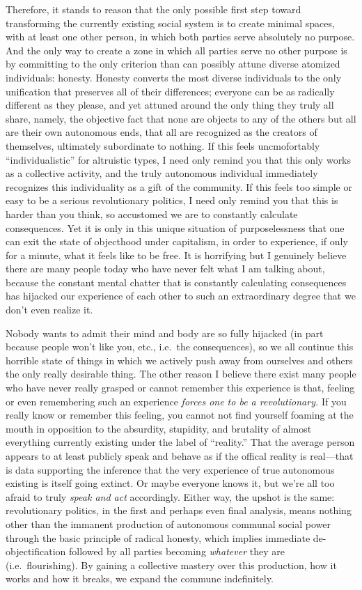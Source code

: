 \documentclass[a4paper,12pt,margin=.5in]{article}
\begin{document}
Therefore, it stands to reason that the only possible first step toward
transforming the currently existing social system is to create minimal
spaces, with at least one other person, in which both parties serve
absolutely no purpose. And the only way to create a zone in which all
parties serve no other purpose is by committing to the only criterion
than can possibly attune diverse atomized individuals: honesty. Honesty
converts the most diverse individuals to the only unification that
preserves all of their differences; everyone can be as radically
different as they please, and yet attuned around the only thing they
truly all share, namely, the objective fact that none are objects to any
of the others but all are their own autonomous ends, that all are
recognized as the creators of themselves, ultimately subordinate to
nothing. If this feels uncmofortably ``individualistic'' for altruistic
types, I need only remind you that this only works as a collective
activity, and the truly autonomous individual immediately recognizes
this individuality as a gift of the community. If this feels too simple
or easy to be a serious revolutionary politics, I need only remind you
that this is harder than you think, so accustomed we are to constantly
calculate consequences. Yet it is only in this unique situation of
purposelessness that one can exit the state of objecthood under
capitalism, in order to experience, if only for a minute, what it feels
like to be free. It is horrifying but I genuinely believe there are many
people today who have never felt what I am talking about, because the
constant mental chatter that is constantly calculating consequences has
hijacked our experience of each other to such an extraordinary degree
that we don't even realize it.

Nobody wants to admit their mind and body are so fully hijacked (in part
because people won't like you, etc., i.e.~the consequences), so we all
continue this horrible state of things in which we actively push away
from ourselves and others the only really desirable thing. The other
reason I believe there exist many people who have never really grasped
or cannot remember this experience is that, feeling or even remembering
such an experience \emph{forces one to be a revolutionary.} If you
really know or remember this feeling, you cannot not find yourself
foaming at the mouth in opposition to the absurdity, stupidity, and
brutality of almost everything currently existing under the label of
``reality.'' That the average person appears to at least publicly speak
and behave as if the offical reality is real---that is data supporting
the inference that the very experience of true autonomous existing is
itself going extinct. Or maybe everyone knows it, but we're all too
afraid to truly \emph{speak and act} accordingly. Either way, the upshot
is the same: revolutionary politics, in the first and perhaps even final
analysis, means nothing other than the immanent production of autonomous
communal social power through the basic principle of radical honesty,
which implies immediate de-objectification followed by all parties
becoming \emph{whatever} they are (i.e.~flourishing). By gaining a
collective mastery over this production, how it works and how it breaks,
we expand the commune indefinitely.
\end{document}
